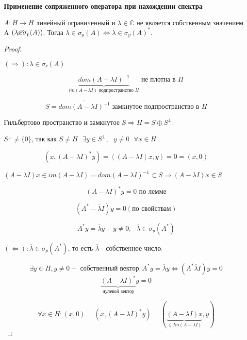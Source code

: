 \documentclass[12pt, a4paper]{report}
\begin{document}
\textbf{Применение сопряженного оператора при нахождении спектра}

\begin{theorem}
    \( A : H \to H  \)  линейный ограниченный и \(  \lambda \in  \mathbb{C} \) не является собственным значением A \( (\lambda \cancel{\in  } \sigma_p (A )) \). Тогда \(  \lambda \in  \sigma_p (A ) \Leftrightarrow  \overline{\lambda } \in  \sigma_p ( A ) ^* .  \) 
\end{theorem}

\begin{proof} \(  \) 

    \( (\Rightarrow ) :  \lambda \in  \sigma_r (A ) \) 

    \[ \underbrace{dom (A - \lambda I ) ^{-1 }}_{im (A - \lambda I ) \text{ подпространство }  H}  \text{ не плотна в } H   \] 

    \[ S = \overline{dom (A - \lambda I )^{-1 } }   \text{ замкнутое подпространство в  }  H \] 

    Гильбертово пространство и замкнутое \( S \Rightarrow H = S \oplus S ^{\perp  }  \). 

    \( S ^{\perp  } \neq \{0 \}  \), так как \( S \neq H  \text{ }  \exists  y \in S^{\perp  } , \text{ }  y \neq 0  \text{ }  \forall  x \in  H \) 

    \[ (x , ( A - \lambda I ) ^* y ) = ( (A - \lambda I ) x , y) =  0 = (x , 0 ) \] 

    \( (A - \lambda I ) x \in  im (A - \lambda I )  = dom (A - \lambda I )^{-1 }  \subset S \Rightarrow (A - \lambda I ) x \in  S   \) 

    \[ (A - \lambda I ) ^* y = 0 \text{ по лемме}  \] 

    \[ (A ^* - \overline{ \lambda } I         ) y = 0 (\text{по свойствам} )\] 

    \[ A ^* y = \overline{\lambda } y + y \neq 0 , \text{ }  \overline{ \lambda } \in  \sigma_p (A ^*)     \] 

    \( (\Leftarrow): \overline{\lambda } \in  \sigma_p (A ^* )     \), то есть \( \overline{ \lambda }   \)   - собственное число. 

    \[ \exists  y \in  H , y \neq 0 - \text{ собственный вектор} : A ^{*  }  y = \overline{\lambda } y \Leftrightarrow ( A ^* \overline{\lambda } I   )y = 0     \] 
    \[ \underbrace{(A  - \lambda I ) ^*}_{\text{нулевой вектор} }    y = 0 \] 

    \[ \forall  x \in  H     : ( x , 0) = (x, (A - \lambda I )^* y ) = ( \underbrace{(A - \lambda I )x}_{\in  Im (A - \lambda I)} , y ) \] 
    

\end{proof}
\end{document}
